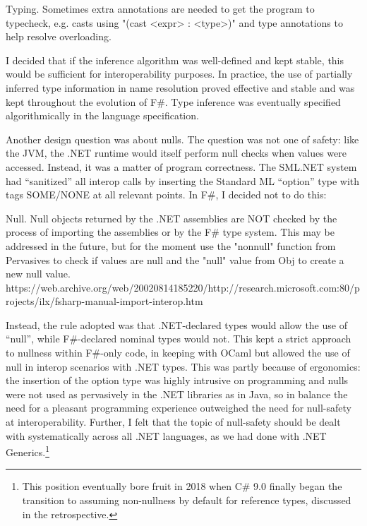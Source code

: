 \documentclass[acmsmall,screen]{acmart}
\begin{document}
\begin{verbquote}
Typing. Sometimes extra annotations are needed to get the program to typecheck, e.g. casts using "(cast <expr> : <type>)" and type annotations to help resolve overloading.
\end{verbquote}

I decided that if the inference algorithm was well-defined and kept stable, this would be sufficient for interoperability purposes. In
practice, the use of partially inferred type information in name resolution proved effective and stable and was kept throughout the
evolution of F\#.  Type inference was eventually specified algorithmically in the language specification. 

Another design question was about nulls. The question was not one of safety: like the JVM, the .NET runtime would itself perform null
checks when values were accessed. Instead, it was a matter of program correctness. The SML.NET system had “sanitized” all interop
calls by inserting the Standard ML “option” type with tags SOME/NONE at all relevant points.  In F\#, I decided not to do this:
\begin{verbquote}
Null.  Null objects returned by the .NET assemblies are NOT checked by the process of importing the assemblies or by the F# type system.  This may be addressed in the future, but for the moment use the "nonnull" function from Pervasives to check if values are null and the "null" value from Obj to create a new null value. https://web.archive.org/web/20020814185220/http://research.microsoft.com:80/projects/ilx/fsharp-manual-import-interop.htm
\end{verbquote}
Instead, the rule adopted was that .NET-declared types would allow the use of “null”, while F\#-declared nominal types would not.  This
kept a strict approach to nullness within F\#-only code, in keeping with OCaml but allowed the use of null in interop scenarios with .NET
types. This was partly because of ergonomics: the insertion of the option type was highly intrusive on programming and nulls were not
used as pervasively in the .NET libraries as in Java, so in balance the need for a pleasant programming experience outweighed the need
for null-safety at interoperability. Further, I felt that the topic of null-safety should be dealt with systematically across all .NET languages, as
we had done with .NET Generics.\footnote{This position eventually bore fruit in 2018 when C\# 9.0 finally began the transition to assuming
non-nullness by default for reference types, discussed in the retrospective.}   
\end{document}
